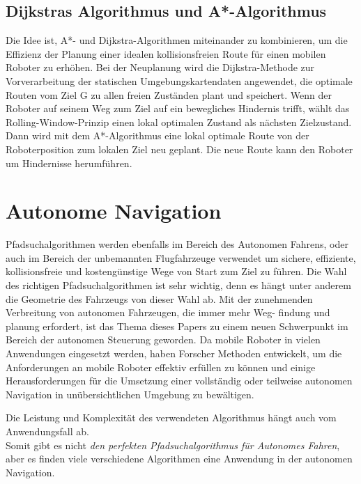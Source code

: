 \subsection{Dijkstras Algorithmus und A*-Algorithmus}

Die Idee ist, A*- und Dijkstra-Algorithmen miteinander zu kombinieren, um die Effizienz der Planung einer idealen kollisionsfreien Route für einen mobilen Roboter zu erhöhen. Bei der Neuplanung wird die Dijkstra-Methode zur Vorverarbeitung der statischen Umgebungskartendaten angewendet, die optimale Routen vom Ziel G zu allen freien Zuständen plant und speichert. Wenn der Roboter auf seinem Weg zum Ziel auf ein bewegliches Hindernis trifft, wählt das Rolling-Window-Prinzip einen lokal optimalen Zustand als nächsten Zielzustand. Dann wird mit dem A*-Algorithmus eine lokal optimale Route von der Roboterposition zum lokalen Ziel neu geplant.
Die neue Route kann den Roboter um Hindernisse herumführen\cite{Hong-mei17}.



\section{Autonome Navigation}
\label{Autonome Navigation}

Pfadsuchalgorithmen werden ebenfalls im Bereich des Autonomen Fahrens, oder auch im Bereich der unbemannten Flugfahrzeuge verwendet
um sichere, effiziente, kollisionsfreie und kostengünstige Wege von Start zum Ziel zu führen. Die Wahl des richtigen Pfadsuchalgorithmen
ist sehr wichtig, denn es hängt unter anderem die Geometrie des Fahrzeugs von dieser Wahl ab.
Mit der zunehmenden Verbreitung von autonomen Fahrzeugen, die immer mehr Weg- findung und planung erfordert, ist das Thema dieses Papers 
zu einem neuen Schwerpunkt im Bereich der autonomen Steuerung geworden.
Da mobile Roboter in vielen Anwendungen eingesetzt werden, haben Forscher Methoden entwickelt, um die 
Anforderungen an mobile Roboter effektiv erfüllen zu können und einige Herausforderungen für die Umsetzung einer vollständig oder
teilweise autonomen Navigation in unübersichtlichen Umgebung zu bewältigen.\cite{Karur:21}

Die Leistung und Komplexität des verwendeten Algorithmus hängt auch vom Anwendungsfall ab. \cite{Karur:21}\\
Somit gibt es nicht \emph{den perfekten Pfadsuchalgorithmus für Autonomes Fahren}, aber es finden viele verschiedene Algorithmen eine 
Anwendung in der autonomen Navigation.
